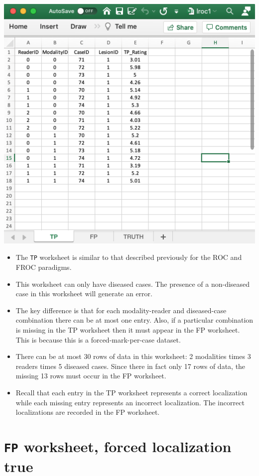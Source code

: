\documentclass[
]{book}
\providecommand{\tightlist}{%
  \setlength{\itemsep}{0pt}\setlength{\parskip}{0pt}}
\begin{document}
\includegraphics[width=1\textwidth,height=\textheight]{images/quick-start/lroc1TP.png}

\begin{itemize}
\tightlist
\item
  The \texttt{TP} worksheet is similar to that described previously for the ROC and FROC paradigms.
\item
  This worksheet can only have diseased cases. The presence of a non-diseased case in this worksheet will generate an error.
\item
  The key difference is that for each modality-reader and diseased-case combination there can be at most one entry. Also, if a particular combination is missing in the TP worksheet then it must appear in the FP worksheet. This is because this is a forced-mark-per-case dataset.
\item
  There can be at most 30 rows of data in this worksheet: 2 modalities times 3 readers times 5 diseased cases. Since there in fact only 17 rows of data, the missing 13 rows must occur in the FP worksheet.
\item
  Recall that each entry in the TP worksheet represents a correct localization while each missing entry represents an incorrect localization. The incorrect localizations are recorded in the FP worksheet.
\end{itemize}

\hypertarget{quick-start-lroc-fp1}{%
\section{\texorpdfstring{\texttt{FP} worksheet, forced localization true}{FP worksheet, forced localization true}}\label{quick-start-lroc-fp1}}
\end{document}
